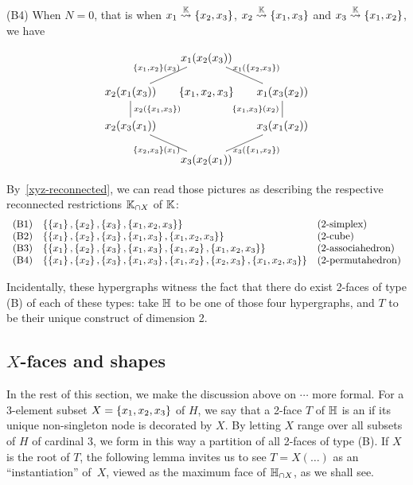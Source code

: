 \smallskip\noindent
(B4) When $N=0$, that is when $x_1\stackrel{{\mathbb K}}{\rightsquigarrow}\left\{x_2,x_3\right\}$, $x_2\stackrel{{\mathbb K}}{\rightsquigarrow}\left\{x_1,x_3\right\}$ and
 $x_3\stackrel{{\mathbb K}}{\rightsquigarrow}\left\{x_1,x_2\right\}$, we have
 
 $$\xymatrix @-1.65pc {&& x_1(x_2(x_3)) \ar @{-}[ddll]_{\set{x_1,x_2}(x_3)} \ar @{-}[ddrr]^{x_1(\set{x_2,x_3})}&& \\
 &&&&\\
 x_2(x_1(x_3)) \ar @{-}[dd]^{x_2(\set{x_1,x_3})}&& \set{x_1,x_2,x_3} && x_1(x_3(x_2))\ar @{-}[dd]_{\set{x_1,x_3}(x_2)}\\
 &&  &&\\
 x_2(x_3(x_1)) \ar @{-}[ddrr]_{\set{x_2,x_3}(x_1)} &&  && \ar @{-}[ddll]^{x_3(\set{x_1,x_2})} x_3(x_1(x_2))\\
 &&&&\\
 &&  x_3(x_2(x_1))&&}
$$

By~\cref{xyz-reconnected}, we can read those pictures as describing the 
respective reconnected restrictions ${\mathbb K}_{\cap X}$ of ${\mathbb K}$:
$$\begin{array}{lll}
\mathrm{(B1)} & \left\{\left\{x_1\right\},\left\{x_2\right\},\left\{x_3\right\},\left\{x_1,x_2,x_3\right\}\right\} & \mbox{(2-simplex)}\\
\mathrm{(B2)} & \left\{\left\{x_1\right\},\left\{x_2\right\},\left\{x_3\right\},\left\{x_1,x_3\right\},\left\{x_1,x_2,x_3\right\}\right\} & \mbox{(2-cube})\\
\mathrm{(B3)} & \left\{\left\{x_1\right\},\left\{x_2\right\},\left\{x_3\right\},\left\{x_1,x_3\right\},\left\{x_1,x_2\right\},\left\{x_1,x_2,x_3\right\}\right\} & \mbox{(2-associahedron)}\\
\mathrm{(B4)} & \left\{\left\{x_1\right\},\left\{x_2\right\},\left\{x_3\right\},\left\{x_1,x_3\right\},\left\{x_1,x_2\right\},\left\{x_2,x_3\right\},\left\{x_1,x_2,x_3\right\}\right\} & \mbox{(2-permutahedron)}
\end{array}$$

Incidentally, these  hypergraphs witness the fact that there do exist 2-faces of type (B) of  each  of these types: take ${\mathbb H}$ to be one of those four hypergraphs, and $T$ to be their unique construct of dimension 2.


\subsection{$X$-faces and shapes}

In the rest of this section, we make the discussion above on $\cdots$ more formal.
For a 3-element subset $X=\left\{x_1,x_2,x_3\right\}$ of $H$, we say that a 2-face $T$ of ${\mathbb H}$ is an  if its unique non-singleton node is decorated by $X$.  By letting $X$ range over all subsets of $H$ of cardinal 3, we form in this way a partition of all 2-faces of type (B).
If $X$ is the root of $T$, the following  lemma invites us to see $T=X(\ldots)$ as an ``instantiation'' of~$X$, viewed as the maximum face of ${\mathbb H}_{\cap X}$, as we shall see.

